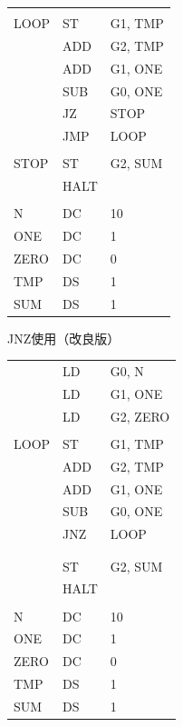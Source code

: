 \documentclass{beamer}                 %
\begin{document}
\begin{frame}
\begin{minipage}{0.36\columnwidth}
{\begin{tabular}{|l|l|l|}
              &        &          \\
      LOOP    & ST     & G1, TMP  \\
              & ADD    & G2, TMP  \\
              & ADD    & G1, ONE  \\
              & SUB    & G0, ONE  \\
              & JZ     & STOP     \\
              & JMP    & LOOP     \\
              &        &          \\
      STOP    & ST     & G2, SUM  \\
              & HALT   &          \\
              &        &          \\
      N       & DC     & 10       \\
      ONE     & DC     & 1        \\
      ZERO    & DC     & 0        \\
      TMP     & DS     & 1        \\
      SUM     & DS     & 1        \\
    \end{tabular}}
  \end{minipage}
  \begin{minipage}{0.36\columnwidth}
    {\ttfamily JNZ使用（改良版）\\\scriptsize
      \begin{tabular}{|l|l|l|}
              & LD     & G0, N    \\
              & LD     & G1, ONE  \\
              & LD     & G2, ZERO \\
              &        &          \\
      LOOP    & ST     & G1, TMP  \\
              & ADD    & G2, TMP  \\
              & ADD    & G1, ONE  \\
              & SUB    & G0, ONE  \\
              & JNZ    & LOOP     \\
              &        &          \\
              &        &          \\
              & ST     & G2, SUM  \\
              & HALT   &          \\
              &        &          \\
      N       & DC     & 10       \\
      ONE     & DC     & 1        \\
      ZERO    & DC     & 0        \\
      TMP     & DS     & 1        \\
      SUM     & DS     & 1        \\
    \end{tabular}}
  \end{minipage}
  \vfill
\end{frame}
\end{document}
